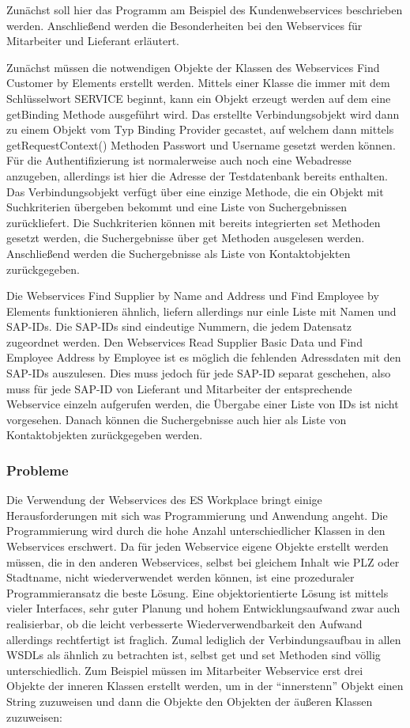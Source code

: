 Zunächst soll hier das Programm am Beispiel des Kundenwebservices beschrieben werden. Anschließend werden die Besonderheiten
bei den Webservices für Mitarbeiter und Lieferant erläutert.

Zunächst müssen die notwendigen Objekte der Klassen des Webservices Find Customer by Elements erstellt werden. Mittels
einer Klasse die immer mit dem Schlüsselwort SERVICE beginnt, kann ein Objekt erzeugt werden auf dem eine getBinding Methode
ausgeführt wird. Das erstellte Verbindungsobjekt wird dann zu einem Objekt vom Typ Binding Provider gecastet, auf welchem dann
mittels getRequestContext() Methoden Passwort und Username gesetzt werden können. Für die Authentifizierung ist normalerweise
auch noch eine Webadresse anzugeben, allerdings ist hier die Adresse der Testdatenbank bereits enthalten. Das 
Verbindungsobjekt verfügt über eine einzige Methode, die ein Objekt mit Suchkriterien übergeben bekommt und eine Liste 
von Suchergebnissen zurückliefert. Die Suchkriterien können mit bereits integrierten set Methoden gesetzt werden,
die Suchergebnisse über get Methoden ausgelesen werden. Anschließend werden die Suchergebnisse als Liste von Kontaktobjekten
zurückgegeben.

Die Webservices Find Supplier by Name and Address und Find Employee by Elements funktionieren ähnlich, liefern allerdings nur 
einle Liste mit Namen und SAP-IDs. Die SAP-IDs sind eindeutige Nummern, die jedem Datensatz zugeordnet werden. Den Webservices
Read Supplier Basic Data und Find Employee Address by Employee ist es möglich die fehlenden Adressdaten mit den SAP-IDs 
auszulesen. Dies muss jedoch für jede SAP-ID separat geschehen, also muss für jede SAP-ID von Lieferant und Mitarbeiter der
entsprechende Webservice einzeln aufgerufen werden, die Übergabe einer Liste von IDs ist nicht vorgesehen. Danach können 
die Suchergebnisse auch hier als Liste von Kontaktobjekten zurückgegeben werden.


\subsubsection{Probleme}

Die Verwendung der Webservices des ES Workplace bringt einige Herausforderungen mit sich was Programmierung und Anwendung
angeht. Die Programmierung wird durch die hohe Anzahl unterschiedlicher Klassen in den Webservices erschwert. Da für jeden
Webservice eigene Objekte erstellt werden müssen, die in den anderen Webservices, selbst bei gleichem Inhalt wie PLZ oder
Stadtname, nicht wiederverwendet werden können, ist eine prozeduraler Programmieransatz die beste Lösung. Eine objektorientierte 
Lösung ist mittels vieler Interfaces, sehr guter Planung und hohem Entwicklungsaufwand zwar auch realisierbar, ob die leicht 
verbesserte Wiederverwendbarkeit den Aufwand allerdings rechtfertigt ist fraglich. Zumal lediglich der Verbindungsaufbau in allen
WSDLs als ähnlich zu betrachten ist, selbst get und set Methoden sind völlig unterschiedlich. Zum Beispiel müssen im Mitarbeiter
Webservice erst drei Objekte der inneren Klassen erstellt werden, um in der ``innerstenn'' Objekt einen String zuzuweisen und 
dann die Objekte den Objekten der äußeren Klassen zuzuweisen:

